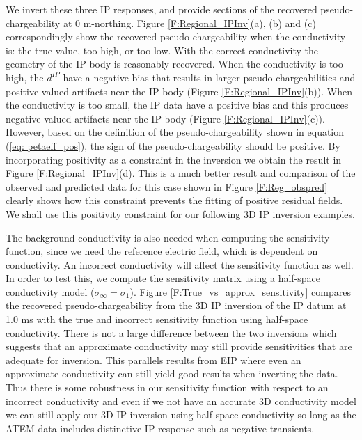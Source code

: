 \documentclass[extra,mreferee]{gji}
\newcommand{\siginf}{\sigma_\infty}
\newcommand{\dip}{d^{IP}}
\begin{document}
We invert these three IP responses, and provide sections of the recovered pseudo-chargeability at 0 m-northing. 
Figure \ref{F:Regional_IPInv}(a), (b) and (c) correspondingly show the recovered pseudo-chargeability when the conductivity is: the true value, too high, or too low.  
With the correct conductivity the geometry of the IP body is reasonably recovered. 
When the conductivity is too high, the $\dip$ have a negative bias that results in larger pseudo-chargeabilities and positive-valued artifacts near the IP body (Figure \ref{F:Regional_IPInv}(b)).  
When the conductivity is too small, the IP data have a positive bias and this produces  negative-valued artifacts near the IP body (Figure \ref{F:Regional_IPInv}(c)). However, based on the  definition of the pseudo-chargeability shown in equation (\ref{eq: petaeff_pos}), the sign of the pseudo-chargeability should be positive. By incorporating positivity as a constraint in the inversion we obtain the result in  Figure \ref{F:Regional_IPInv}(d).  This is a much better result and comparison of the observed and predicted data for this case shown in Figure \ref{F:Reg_obspred} clearly shows how this constraint prevents the fitting of positive residual fields. We shall use this positivity  constraint for our following 3D IP inversion examples. 

The background conductivity is also needed when computing the sensitivity function, since we need the reference electric field, which is dependent on conductivity. 
An incorrect conductivity will affect the sensitivity function as well. 
In order to test this, we compute the sensitivity  matrix using a half-space conductivity model ($\siginf = \sigma_1$). 
Figure \ref{F:True_vs_approx_sensitivity} compares the recovered pseudo-chargeability from the 3D IP inversion of the IP datum at 1.0 ms with the true and incorrect sensitivity function using half-space conductivity. 
There is not a large difference between the two inversions  which suggests that an approximate conductivity may still provide sensitivities that are adequate for inversion. This parallels results from EIP where even an approximate conductivity can still yield good results when inverting the data. Thus there is some robustness in our sensitivity function with respect to an  incorrect conductivity and even if we  not have an accurate 3D conductivity model we can still apply our 3D IP inversion using half-space conductivity so long as the ATEM data includes distinctive IP response such as negative transients.

\end{document}
